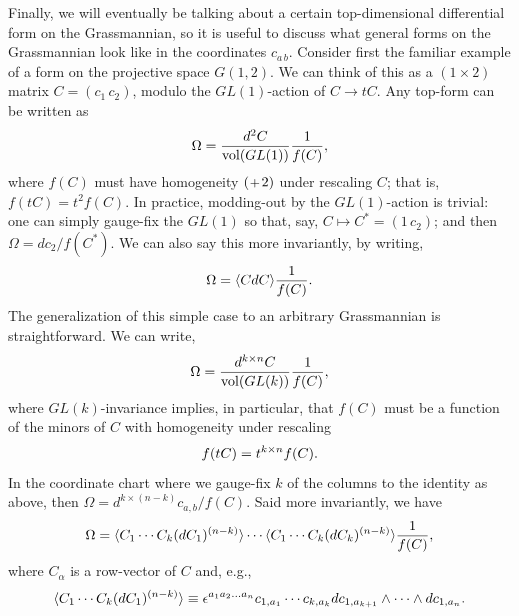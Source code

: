 \documentclass[12pt,hyperref,compress]{JHEP3}
\newcommand{\eq}[1]{\begin{equation}#1\end{equation}}
\newcommand{\pl}{\hspace{0.5pt}\text{{\small+}}\hspace{-0.5pt}}
\begin{document}
Finally, we will eventually be talking about a certain top-dimensional differential form on the Grassmannian, so it is useful to discuss what general forms on the Grassmannian look like in the coordinates $c_{a\,b}$. Consider first the familiar example of a form on the projective space $G(1,2)$. We can think of this as a $(1\!\times\! 2)$ matrix $C = (c_1 \, c_2)$, modulo the $GL(1)$-action of $C\!\to\!t C$. Any top-form can be written as
\vspace{-.2cm}\eq{\Omega =\frac{ d^2 C}{{\rm vol }(GL(1))} \frac{1}{f(C)},\vspace{-.2cm}}
where $f(C)$ must have homogeneity $(\pl\,2)$ under rescaling $C$; that is, $f(t C) = t^{2} f(C)$. In practice, modding-out by the $GL(1)$-action is trivial: one can simply gauge-fix the $GL(1)$ so that, say, $C\!\mapsto\!C^*=(1 \, c_2)$; and then $\Omega = dc_2 /f (C^*)$. We can also say this more invariantly, by writing,
\vspace{-.2cm}\eq{\Omega = \langle C d C \rangle \frac{1}{f(C)}.\vspace{-.2cm}}
The generalization of this simple case to an arbitrary Grassmannian is straightforward. We can write,
\vspace{-.2cm}\eq{\Omega = \frac{d^{k \times n} C}{{\rm vol}(GL(k))} \frac{1}{f(C)},\vspace{-.0cm}}
where  $GL(k)$-invariance implies, in particular, that $f(C)$ must be a function of the minors of $C$ with homogeneity under rescaling
\vspace{-.2cm}\eq{f(t C) = t^{k\times n} f(C).\vspace{-.2cm}}
In the coordinate chart where we gauge-fix $k$ of the columns to the identity as above, then $\Omega = d^{k\times (n-k)}c_{a,b}/f(C)$. Said more invariantly, we have
\vspace{-.2cm}\eq{\Omega = \langle C_1 \cdots C_k (dC_1)^{(n-k)} \rangle \cdots \langle C_1 \cdots C_k (dC_k)^{(n-k)} \rangle \frac{1}{f(C)},\vspace{-.2cm}}
where $C_\alpha$ is a row-vector of $C$ and, e.g.,
\vspace{-.2cm}\eq{\langle C_1 \cdots C_k (dC_1)^{(n-k)} \rangle \equiv \epsilon^{a_1a_2\ldots a_n} c_{1,a_1}\cdots c_{k,a_k}dc_{1,a_{k+1}}\wedge\cdots \wedge dc_{1,a_{n}}.\vspace{-.2cm}}
\end{document}
